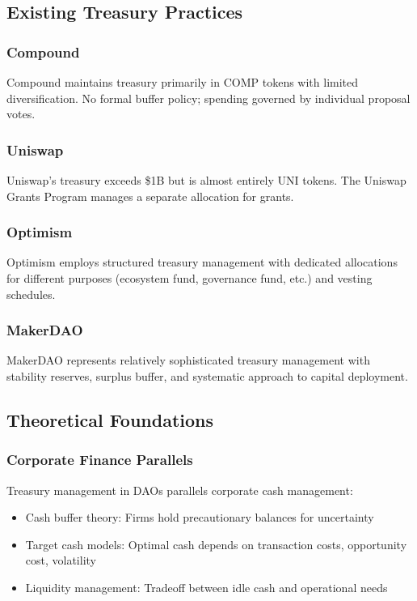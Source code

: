 \subsection{Existing Treasury Practices}

\subsubsection{Compound}

Compound maintains treasury primarily in COMP tokens with limited diversification. No formal buffer policy; spending governed by individual proposal votes.

\subsubsection{Uniswap}

Uniswap's treasury exceeds \$1B but is almost entirely UNI tokens. The Uniswap Grants Program manages a separate allocation for grants.

\subsubsection{Optimism}

Optimism employs structured treasury management with dedicated allocations for different purposes (ecosystem fund, governance fund, etc.) and vesting schedules.

\subsubsection{MakerDAO}

MakerDAO represents relatively sophisticated treasury management with stability reserves, surplus buffer, and systematic approach to capital deployment.

\subsection{Theoretical Foundations}

\subsubsection{Corporate Finance Parallels}

Treasury management in DAOs parallels corporate cash management:
\begin{itemize}
    \item Cash buffer theory: Firms hold precautionary balances for uncertainty
    \item Target cash models: Optimal cash depends on transaction costs, opportunity cost, volatility
    \item Liquidity management: Tradeoff between idle cash and operational needs
\end{itemize}

